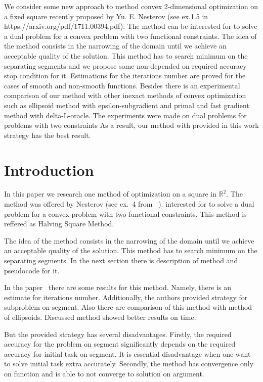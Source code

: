\documentclass[12pt]{article}
\begin{document}
\tableofcontents
\newpage

We consider some new approach to method convex 2-dimensional optimization on a fixed square recently proposed by Yu. E. Nesterov (see ex.1.5 in https://arxiv.org/pdf/1711.00394.pdf). The method can be interested for to solve a dual problem for a convex problem with two functional constraints. The idea of the method consists in the narrowing of the domain until we achieve an acceptable quality of the solution. This method has to search minimum on the separating segments and we propose some non-depended on required accuracy stop condition for it. Estimations for the iterations number are proved for the cases of smooth and non-smooth functions. Besides there is an experimental comparison of our method with other inexact methods of convex optimization such as ellipsoid method with epsilon-subgradient and primal and fast gradient method with delta-L-oracle. The experiments were made on dual problems for problems with two constraints As a result, our method with provided in this work strategy has the best result.

\section{Introduction}

In this paper we research one method of optimization on a square in $\mathbb{R}^2$. The method was offered by Nesterov (see ex.~4 from ~\cite{task}). interested for to solve a dual problem for a convex problem with two functional constraints. This method is reffered as Halving Square Method. 

 The idea of the method consists in the narrowing of the domain until we achieve an acceptable quality of the solution. This method has to search minimum on the separating segments. In the next section there is description of method and pseudocode for it.

In the paper~\cite{Ston_Pas} there are some results for this method. Namely, there is an estimate for iterations number. Additionally, the authors provided strategy for subproblem on segment. Also there are comparison of this method with method of ellipsoids. Discussed method showed better results on time.

But the provided strategy has several disadvantages. Firstly, the required accuracy for the problem on segment significantly depends on the required accuracy for initial task on segment. It is essential disadvantage when one want to solve initial task extra accurately. Secondly, the method has convergence only on function and is able to not converge to solution on argument.
\end{document}
